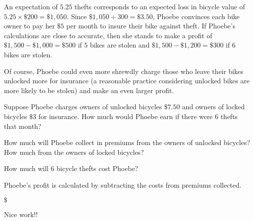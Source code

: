 \documentclass{ximera}
\begin{document}
An expectation of $5.25$ thefts corresponds to an expected loss in bicycle value of $5.25\times\$200=\$1,050$. Since $\$1,050\div 300=\$3.50$, Phoebe convinces each bike owner to pay her $\$5$ per month to insure their bike against theft. If Phoebe's calculations are close to accurate, then she stands to make a profit of $\$1,500-\$1,000=\$500$ if $5$ bikes are stolen and $\$1,500-\$1,200=\$300$ if $6$ bikes are stolen.

Of course, Phoebe could even more shrewdly charge those who leave their bikes unlocked more for insurance (a reasonable practice considering unlocked bikes are more likely to be stolen) and make an even larger profit.


\begin{question}
Suppose Phoebe charges owners of unlocked bicycles $\$7.50$ and owners of locked bicycles $\$3$ for insurance. How much would Phoebe earn if there were $6$ thefts that month?

\begin{hint}
How much will Phoebe collect in premiums from the owners of unlocked bicycles? How much from the owners of locked bicycles?
\end{hint}
\begin{hint}
How much will $6$ bicycle thefts cost Phoebe?
\end{hint}
\begin{hint}
Phoebe's profit is calculated by subtracting the costs from premiums collected.
\end{hint}
$\$$

Nice work!!
\end{question}
\end{document}
